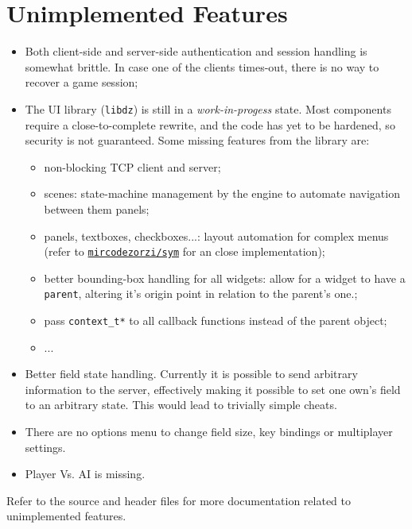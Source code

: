 \documentclass{report}
\begin{document}
\section{Unimplemented Features}

\begin{itemize}
  \item Both client-side and server-side authentication and session handling is somewhat brittle. In case one of the clients times-out, there is no way to recover a game session;
  \item The UI library (\texttt{libdz}) is still in a \textit{work-in-progess} state. Most components require a close-to-complete rewrite, and the code has yet to be hardened, so security is not guaranteed. Some missing features from the library are:
  \begin{itemize}
    \item non-blocking TCP client and server;
    \item scenes: state-machine management by the engine to automate navigation between them panels;
    \item panels, textboxes, checkboxes...: layout automation for complex menus (refer to \href{https://github.com/mircodezorzi/sym}{\texttt{mircodezorzi/sym}} for an close implementation);
    \item better bounding-box handling for all widgets: allow for a widget to have a \texttt{parent}, altering it's origin point in relation to the parent's one.;
    \item pass \texttt{context\_t*} to all callback functions instead of the parent object;
    \item ...
  \end{itemize}
  \item Better field state handling. Currently it is possible to send arbitrary information to the server, effectively making it possible to set one own's field to an arbitrary state. This would lead to trivially simple cheats.
  \item There are no options menu to change field size, key bindings or multiplayer settings.
  \item Player Vs. AI is missing.
\end{itemize}

\noindent Refer to the source and header files for more documentation related to unimplemented features.
\end{document}

